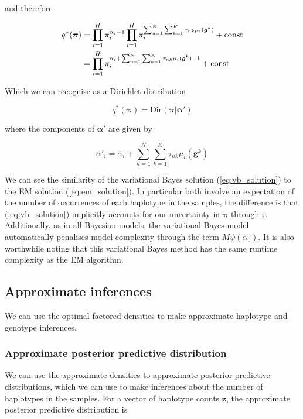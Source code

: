\documentclass{article}
\begin{document}
and therefore

\begin{align}
    q^*(\boldsymbol{\pi}) &= \prod_{i = 1}^H \pi_i^{\alpha_i - 1} \prod_{i = 1}^H \pi_i^{\sum_{n = 1}^N \sum_{k = 1}^K \tau_{nk} \mu_i(\boldsymbol{g}^k)} + \text{const} \notag \\
    &= \prod_{i = 1}^H \pi_i^{\alpha_i + \sum_{n = 1}^N \sum_{k = 1}^K \tau_{nk} \mu_i(\boldsymbol{g}^k) - 1} + \text{const}
\end{align}

Which we can recognise as a Dirichlet distribution

\begin{equation}
q^*(\boldsymbol{\pi}) = \text{Dir}(\boldsymbol{\pi} | \boldsymbol{\alpha}')
\end{equation}

where the components of $\boldsymbol{\alpha}'$ are given by

\begin{equation}
\label{eq:vb_solution}
\alpha'_i = \alpha_i + \sum_{n = 1}^N \sum_{k = 1}^K \tau_{nk} \mu_i(\boldsymbol{g}^k)
\end{equation}

We can see the similarity of the variational Bayes solution (\ref{eq:vb_solution}) to the EM solution (\ref{eq:em_solution}). In particular both involve an expectation of the number of occurrences of each haplotype in the samples, the difference is that (\ref{eq:vb_solution}) implicitly accounts for our uncertainty in $\boldsymbol{\pi}$ through $\tau$. Additionally, as in all Bayesian models, the variational Bayes model automatically penalises model complexity through the term $M\psi(\alpha_0)$. It is also worthwhile noting that this variational Bayes method has the same runtime complexity as the EM algorithm.

\subsection{Approximate inferences}

We can use the optimal factored densities to make approximate haplotype and genotype inferences. 

\subsubsection{Approximate posterior predictive distribution}

We can use the approximate densities to approximate posterior predictive distributions, which we can use to make inferences about the number of haplotypes in the samples. For a vector of haplotype counts $\boldsymbol{z}$, the approximate posterior predictive distribution is
\end{document}
